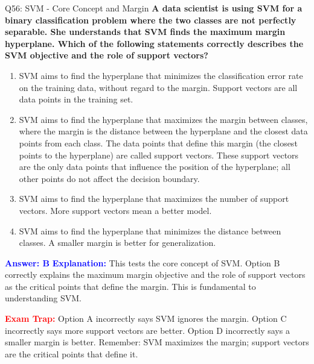 \documentclass[8pt]{beamer}
\begin{document}
	\begin{frame}{Q56: SVM - Core Concept and Margin}
		\fontsize{6.5}{7.5}\selectfont
		\textbf{A data scientist is using SVM for a binary classification problem where the two classes are not perfectly separable. She understands that SVM finds the maximum margin hyperplane. Which of the following statements correctly describes the SVM objective and the role of support vectors?}
		
		\begin{enumerate}
			\item SVM aims to find the hyperplane that minimizes the classification error rate on the training data, without regard to the margin. Support vectors are all data points in the training set.
			\item SVM aims to find the hyperplane that maximizes the margin between classes, where the margin is the distance between the hyperplane and the closest data points from each class. The data points that define this margin (the closest points to the hyperplane) are called support vectors. These support vectors are the only data points that influence the position of the hyperplane; all other points do not affect the decision boundary.
			\item SVM aims to find the hyperplane that maximizes the number of support vectors. More support vectors mean a better model.
			\item SVM aims to find the hyperplane that minimizes the distance between classes. A smaller margin is better for generalization.
		\end{enumerate}
		
		\vspace{0.1cm}
		\textcolor{blue}{\textbf{Answer: B}}
		\vspace{0.1cm}
		\textcolor{blue}{\textbf{Explanation:}} This tests the core concept of SVM. Option B correctly explains the maximum margin objective and the role of support vectors as the critical points that define the margin. This is fundamental to understanding SVM.
		
		\textcolor{red}{\textbf{Exam Trap:}} Option A incorrectly says SVM ignores the margin. Option C incorrectly says more support vectors are better. Option D incorrectly says a smaller margin is better. Remember: SVM maximizes the margin; support vectors are the critical points that define it.
	\end{frame}
	
\end{document}
